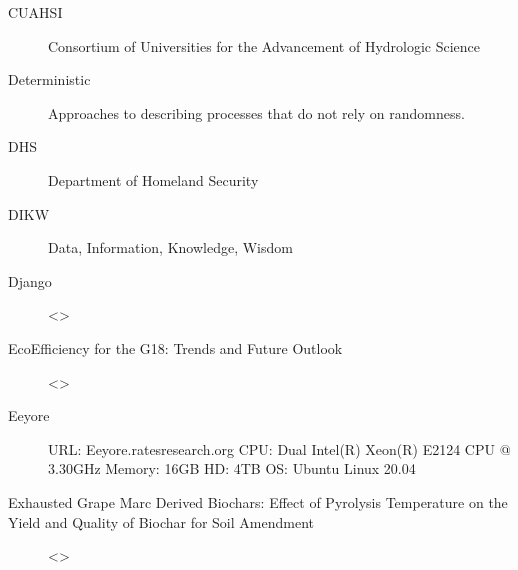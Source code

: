 \documentclass[letterpaper,10pt,english]{sphinxmanual}
\begin{document}
\begin{description}
\item[{CUAHSI\label{\detokenize{glossary:term-CUAHSI}}}] \leavevmode
\sphinxAtStartPar
Consortium of Universities for the Advancement of Hydrologic Science

\item[{Deterministic\label{\detokenize{glossary:term-Deterministic}}}] \leavevmode
\sphinxAtStartPar
Approaches to describing processes that do not rely on randomness.

\item[{DHS\label{\detokenize{glossary:term-DHS}}}] \leavevmode
\sphinxAtStartPar
Department of Homeland Security

\item[{DIKW\label{\detokenize{glossary:term-DIKW}}}] \leavevmode
\sphinxAtStartPar
Data, Information, Knowledge, Wisdom

\item[{Django\label{\detokenize{glossary:term-Django}}}] \leavevmode
\sphinxAtStartPar
\textless{}\textgreater{}

\item[{Eco\sphinxhyphen{}Efficiency for the G18: Trends and Future Outlook\label{\detokenize{glossary:term-Eco-Efficiency-for-the-G18-Trends-and-Future-Outlook}}}] \leavevmode
\sphinxAtStartPar
\textless{}\textgreater{}

\item[{Eeyore\label{\detokenize{glossary:term-Eeyore}}}] \leavevmode
\sphinxAtStartPar
URL: Eeyore.ratesresearch.org CPU: Dual Intel(R) Xeon(R) E\sphinxhyphen{}2124 CPU @ 3.30GHz Memory: 16GB HD: 4TB OS: Ubuntu Linux 20.04

\item[{Exhausted Grape Marc Derived Biochars: Effect of Pyrolysis Temperature on the Yield and Quality of Biochar for Soil Amendment\label{\detokenize{glossary:term-Exhausted-Grape-Marc-Derived-Biochars-Effect-of-Pyrolysis-Temperature-on-the-Yield-and-Quality-of-Biochar-for-Soil-Amendment}}}] \leavevmode
\sphinxAtStartPar
\textless{}\textgreater{}


\end{description}
\end{document}
